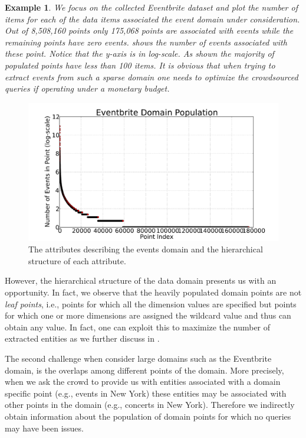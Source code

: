 \documentclass{vldb}
\newtheorem{example}{Example}
\begin{document}
\begin{example}
We focus on the collected Eventbrite dataset and plot the number of items for each of the data items associated the event domain under consideration. Out of 8,508,160 points only 175,068 points are associated with events while the remaining points have zero events.  shows the number of events associated with these point. Notice that the y-axis is in log-scale. As shown the majority of populated points have less than 100 items. It is obvious that when trying to extract events from such a sparse domain one needs to optimize the crowdsourced queries if operating under a monetary budget.
\end{example}

\begin{figure}
	\begin{center}
	\includegraphics[trim=55 0 62 0,clip,scale=0.25]{figs/eventBritePopulationS.pdf}
	\caption{The attributes describing the events domain and the hierarchical structure of each attribute.}
	\label{fig:eventbritepop}
	\vspace{-20pt}
	\end{center}
\end{figure}

However, the hierarchical structure of the data domain presents us with an opportunity. In fact, we observe that the heavily populated domain points are not {\em leaf points}, i.e., points for which all the dimension values are specified but points for which one or more dimensions are assigned the wildcard value and thus can obtain any value. In fact, one can exploit this to maximize the number of extracted entities as we further discuss in .

The second challenge when consider large domains such as the Eventbrite domain, is the overlaps among different points of the domain. More precisely, when we ask the crowd to provide us with entities associated with a domain specific point (e.g., events in New York) these entities may be associated with other points in the domain (e.g., concerts in New York). Therefore we indirectly obtain information about the population of domain points for which no queries may have been issues. 
\end{document}
